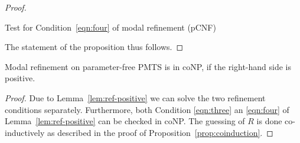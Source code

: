 \begin{proof}
\begin{algorithm}[h]

\;
\caption{Test for Condition~\eqref{eqn:four} of modal
refinement (pCNF)\label{alg:poly2}} 
\end{algorithm}
The statement of the proposition thus follows.

\end{proof}



























\begin{proposition}
Modal refinement on parameter-free PMTS is in coNP, if the 
right-hand side is positive.
\end{proposition}
\begin{proof}
Due to Lemma~\ref{lem:ref-positive} we can solve the two refinement conditions separately.
Furthermore, both Condition \eqref{eqn:three} an \eqref{eqn:four} of Lemma~\ref{lem:ref-positive} can be checked in coNP. The guessing of $R$ is 
done co-inductively as described in the proof of 
Proposition~\ref{prop:coinduction}.

\end{proof}

